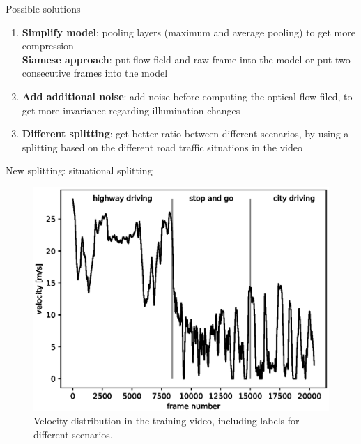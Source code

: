 \begin{frame}{Possible solutions}
\begin{enumerate}
\item \textbf{Simplify model}: pooling layers (maximum and average pooling) to get more compression\\
\textbf{Siamese approach}: put flow field and raw frame into the model or put two consecutive frames into the model
\item \textbf{Add additional noise}: add noise before computing the optical flow filed, to get more invariance regarding illumination changes
\item \textbf{Different splitting}: get better ratio between different scenarios, by using a splitting based on the different road traffic situations in the video
\end{enumerate}
\end{frame}

\begin{frame}{New splitting: situational splitting}
\begin{figure}
\centering
\includegraphics[scale=0.5]{./imgs/plot_speed_time_new_splitting.eps}
\caption{Velocity distribution in the training video, including labels for different scenarios.}
\end{figure}
\end{frame}

